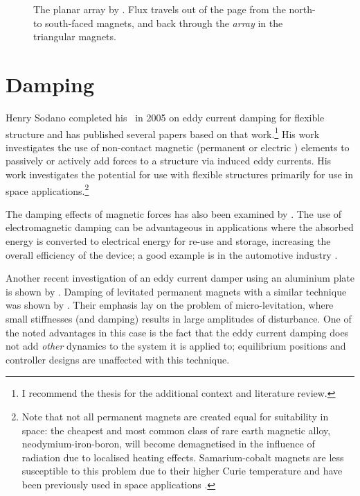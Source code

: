 \begin{figure}
   \caption[Novel planar array shown in the literature.]{%
     The planar array by \textcite{cho2001}. Flux travels out of the page 
     from the north- to south-faced magnets, and back through the \emph{array} 
     in the triangular magnets.}
\end{figure}



\section{Damping}

\cite{tentor2001}

Henry Sodano completed his \PhD\ in 2005 \cite{sodano2005thesis} on
eddy current damping for flexible structure and has published several
papers based on that work.\footnote{I recommend the thesis for the
  additional context and literature review.} His work investigates the
use of non-contact magnetic (permanent \cite{sodano2005,sodano2006,sodano2008} or
electric \cite{sodano2007}) elements to passively \cite{sodano2005} or
actively \cite{sodano2006,sodano2007,sodano2008} add forces to a structure via
induced eddy currents. His work investigates the potential for use
with flexible structures primarily for use in space
applications.\footnote{Note that not all permanent magnets are created
  equal for suitability in space: the cheapest and most common class
  of rare earth magnetic alloy, neodymium-iron-boron, will become
  demagnetised in the influence of radiation due to localised heating
  effects. Samarium-cobalt magnets are less susceptible to this
  problem due to their higher Curie temperature and have been
  previously used in space applications \cite{chen2005}.}

The damping effects of magnetic forces has also been examined by
\textcite{bonisoli2006}. The use of electromagnetic damping can be
advantageous in applications where the absorbed energy is converted to
electrical energy for re-use and storage, increasing the overall
efficiency of the device; a good example is in the automotive industry
\cite{graves2000thesis}. 

Another recent investigation of an eddy current damper using an aluminium
plate is shown by \textcite{ebrahimi2008}. Damping of levitated permanent
magnets with a similar technique was shown by \textcite{elbuken2006}. Their
emphasis lay on the problem of micro-levitation, where small stiffnesses (and
damping) results in large amplitudes of disturbance. One of the noted
advantages in this case is the fact that the eddy current damping does not add
\emph{other} dynamics to the system it is applied to; equilibrium positions
and controller designs are unaffected with this technique.


